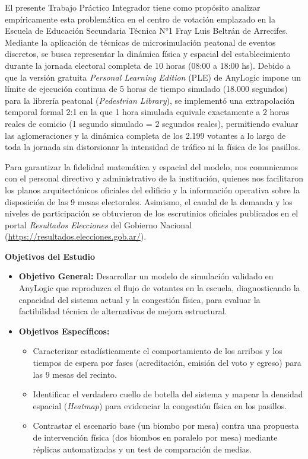 \documentclass[11pt,a4paper]{article}
\begin{document}
El presente Trabajo Práctico Integrador tiene como propósito analizar empíricamente esta problemática en el centro de votación emplazado en la Escuela de Educación Secundaria Técnica N°1 Fray Luis Beltrán de Arrecifes. Mediante la aplicación de técnicas de microsimulación peatonal de eventos discretos, se busca representar la dinámica física y espacial del establecimiento durante la jornada electoral completa de 10 horas (08:00 a 18:00 hs). Debido a que la versión gratuita \textit{Personal Learning Edition} (PLE) de AnyLogic impone un límite de ejecución continua de 5 horas de tiempo simulado (18.000 segundos) para la librería peatonal (\textit{Pedestrian Library}), se implementó una extrapolación temporal formal 2:1 en la que 1 hora simulada equivale exactamente a 2 horas reales de comicio (1 segundo simulado = 2 segundos reales), permitiendo evaluar las aglomeraciones y la dinámica completa de los 2.199 votantes a lo largo de toda la jornada sin distorsionar la intensidad de tráfico ni la física de los pasillos.

Para garantizar la fidelidad matemática y espacial del modelo, nos comunicamos con el personal directivo y administrativo de la institución, quienes nos facilitaron los planos arquitectónicos oficiales del edificio y la información operativa sobre la disposición de las 9 mesas electorales. Asimismo, el caudal de la demanda y los niveles de participación se obtuvieron de los escrutinios oficiales publicados en el portal \textit{Resultados Elecciones} del Gobierno Nacional (\url{https://resultados.elecciones.gob.ar/}).

\vspace{0.5cm}
\noindent \textbf{Objetivos del Estudio}
\begin{itemize}
    \item \textbf{Objetivo General:} Desarrollar un modelo de simulación validado en AnyLogic que reproduzca el flujo de votantes en la escuela, diagnosticando la capacidad del sistema actual y la congestión física, para evaluar la factibilidad técnica de alternativas de mejora estructural.
    \item \textbf{Objetivos Específicos:}
    \begin{itemize}
        \item Caracterizar estadísticamente el comportamiento de los arribos y los tiempos de espera por fases (acreditación, emisión del voto y egreso) para las 9 mesas del recinto.
        \item Identificar el verdadero cuello de botella del sistema y mapear la densidad espacial (\textit{Heatmap}) para evidenciar la congestión física en los pasillos.
        \item Contrastar el escenario base (un biombo por mesa) contra una propuesta de intervención física (dos biombos en paralelo por mesa) mediante réplicas automatizadas y un test de comparación de medias.
    \end{itemize}
\end{itemize}
\end{document}
